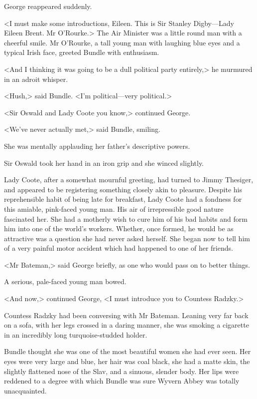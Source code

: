 George reappeared suddenly.

<I must make some introductions, Eileen. This is Sir Stanley Digby—Lady Eileen Brent. Mr O'Rourke.> The Air Minister was a little round man with a cheerful smile. Mr O'Rourke, a tall young man with laughing blue eyes and a typical Irish face, greeted Bundle with enthusiasm.

<And I thinking it was going to be a dull political party entirely,> he murmured in an adroit whisper.

<Hush,> said Bundle. <I'm political—very political.>

<Sir Oswald and Lady Coote you know,> continued George.

<We've never actually met,> said Bundle, smiling.

She was mentally applauding her father's descriptive powers.

Sir Oswald took her hand in an iron grip and she winced slightly.

Lady Coote, after a somewhat mournful greeting, had turned to Jimmy Thesiger, and appeared to be registering something closely akin to pleasure. Despite his reprehensible habit of being late for breakfast, Lady Coote had a fondness for this amiable, pink-faced young man. His air of irrepressible good nature fascinated her. She had a motherly wish to cure him of his bad habits and form him into one of the world's workers. Whether, once formed, he would be as attractive was a question she had never asked herself. She began now to tell him of a very painful motor accident which had happened to one of her friends.

<Mr Bateman,> said George briefly, as one who would pass on to better things.

A serious, pale-faced young man bowed.

<And now,> continued George, <I must introduce you to Countess Radzky.>

Countess Radzky had been conversing with Mr Bateman. Leaning very far back on a sofa, with her legs crossed in a daring manner, she was smoking a cigarette in an incredibly long turquoise-studded holder.

Bundle thought she was one of the most beautiful women she had ever seen. Her eyes were very large and blue, her hair was coal black, she had a matte skin, the slightly flattened nose of the Slav, and a sinuous, slender body. Her lips were reddened to a degree with which Bundle was sure Wyvern Abbey was totally unacquainted.

